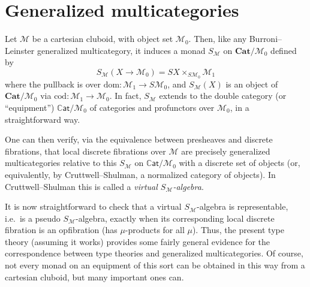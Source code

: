\documentclass{amsart}
\theoremstyle{definition}
\def\M{\mathcal{M}}
\begin{document}
\section{Generalized multicategories}
\label{sec:genmulti}

Let $\M$ be a cartesian cluboid, with object set $\M_0$.
Then, like any Burroni--Leinster generalized multicategory, it induces a monad $S_\M$ on $\mathbf{Cat}/{\M_0}$ defined by
\[ S_\M(X\to \M_0) = SX \times_{S\M_0} \M_1 \]
where the pullback is over $\mathrm{dom}:\M_1 \to S\M_0$, and $S_\M(X)$  is an object of $\mathbf{Cat}/{\M_0}$ via $\mathrm{cod}:\M_1 \to \M_0$.
In fact, $S_\M$ extends to the double category (or ``equipment'') $\mathbb{C}\mathsf{at}/{\M_0}$ of categories and profunctors over $\M_0$, in a straightforward way.

One can then verify, via the equivalence between presheaves and discrete fibrations, that local discrete fibrations over $\M$ are precisely generalized multicategories relative to this $S_\M$ on $\mathbb{C}\mathsf{at}/{\M_0}$ with a discrete set of objects (or, equivalently, by Cruttwell--Shulman, a normalized category of objects).
In Cruttwell--Shulman this is called a \emph{virtual $S_\M$-algebra}.

It is now straightforward to check that a virtual $S_\M$-algebra is representable, i.e.\ is a pseudo $S_\M$-algebra, exactly when its corresponding local discrete fibration is an opfibration (has $\mu$-products for all $\mu$).
Thus, the present type theory (assuming it works) provides some fairly general evidence for the correspondence between type theories and generalized multicategories.
Of course, not every monad on an equipment of this sort can be obtained in this way from a cartesian cluboid, but many important ones can.
\end{document}
